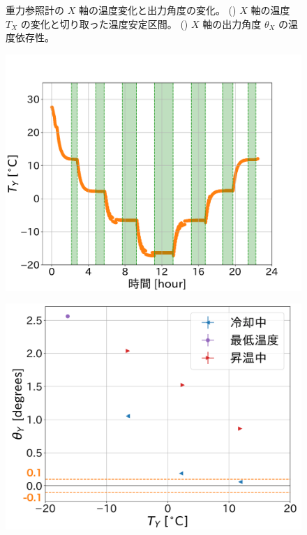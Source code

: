 \documentclass[../../main.tex]{subfiles}
\begin{document}
\begin{figure}[H]
\begin{minipage}[b]{0.45\columnwidth}
        \subcaption{}
        \label{fig:angleX_temp_dep}
    \end{minipage}
    \caption{重力参照計の $X$ 軸の温度変化と出力角度の変化。
             () $X$ 軸の温度 $T_{X}$ の変化と切り取った温度安定区間。
             () $X$ 軸の出力角度 $\theta_{X}$ の温度依存性。}
    \label{fig:evaluation_bath_Xaxis}
\end{figure}
\begin{figure}[H]
    \begin{minipage}[b]{0.45\columnwidth}
        \centering
        \includegraphics[width=1.1\columnwidth]{tiltsensor/bath_tempY.pdf}
        \subcaption{}
        \label{fig:bath_tempY}
    \end{minipage}
    \hspace{0.005\columnwidth}
    \begin{minipage}[b]{0.45\columnwidth}
        \centering
        \includegraphics[width=1.03\columnwidth]{tiltsensor/angleY_temp_dep.pdf}

\end{minipage}
\end{figure}
\end{document}
